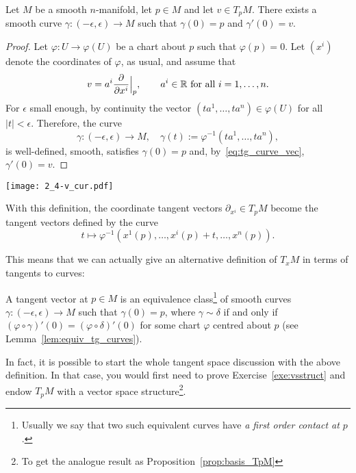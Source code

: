 \begin{theorem}
  Let $M$ be a smooth $n$-manifold, let $p\in M$ and let $v\in T_pM$.
  There exists a smooth curve $\gamma: (-\epsilon,\epsilon) \to M$ such that $\gamma(0)=p$ and $\gamma'(0) = v$.
\end{theorem}
\begin{proof}
  Let $\varphi:U\to\varphi(U)$ be a chart about $p$ such that $\varphi(p)=0$.
  Let $(x^i)$ denote the coordinates of $\varphi$, as usual, and assume that
  \begin{equation}
    v = a^i \frac{\partial}{\partial x^i}\Big|_p, \qquad a^i \in\mathbb{R} \mbox{ for all } i=1,\ldots,n.
  \end{equation}
  For $\epsilon$ small enough, by continuity the vector $(ta^1, \ldots, ta^n) \in \varphi(U)$ for all $|t|<\epsilon$. Therefore, the curve
  \begin{equation}
    \gamma: (-\epsilon, \epsilon) \to M, \quad \gamma(t):=\varphi^{-1}(ta^1, \ldots, ta^n),
  \end{equation}
  is well-defined, smooth, satisfies $\gamma(0) = p$ and, by~\eqref{eq:tg_curve_vec}, $\gamma'(0) = v$.
\end{proof}

\begin{marginfigure}
  \texttt{[image: 2\_4-v\_cur.pdf]}
  \caption{With this definition, the coordinate tangent vectors $\partial_{x^i}\in T_p M$ become the tangent vectors defined by the curve \[t \mapsto \varphi^{-1}(x^1(p), \ldots, {x^i(p) + t}, \ldots, x^n(p)).\]}
  \label{fig:2_4-v_cur}
\end{marginfigure}
This means that we can actually give an alternative definition of $T_xM$ in terms of tangents to curves:
\begin{definition}\label{def:tg:ascurvespeed}
  A tangent vector at $p\in M$ is an equivalence class\footnote{Usually we say that two such equivalent curves have \emph{a first order contact at $p$}.} of smooth curves $\gamma:(-\epsilon, \epsilon)\to M$ such that $\gamma(0)=p$, where $\gamma\sim\delta$ if and only if $(\varphi\circ \gamma)'(0) = (\varphi\circ\delta)'(0)$ for some chart $\varphi$ centred about $p$ (see Lemma~\ref{lem:equiv_tg_curves}).
\end{definition}

In fact, it is possible to start the whole tangent space discussion with the above definition. In that case, you would first need to prove Exercise~\ref{exe:vsstruct} and endow $T_pM$ with a vector space structure\footnote{To get the analogue result as Proposition~\ref{prop:basis_TpM}}.

